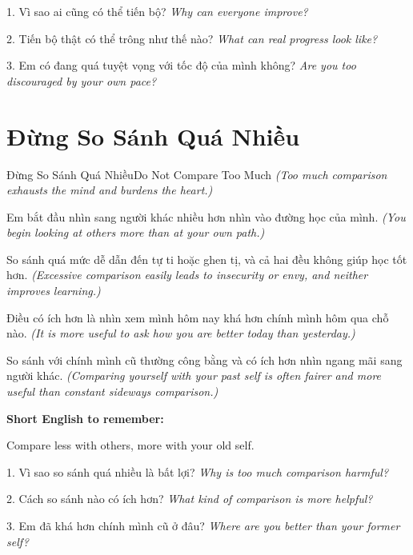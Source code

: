 \begin{tuhocnhanh}
1. Vì sao ai cũng có thể tiến bộ? \textit{Why can everyone improve?}

2. Tiến bộ thật có thể trông như thế nào? \textit{What can real progress look like?}

3. Em có đang quá tuyệt vọng với tốc độ của mình không? \textit{Are you too discouraged by your own pace?}
\end{tuhocnhanh}
\ngancach

\section{Đừng So Sánh Quá Nhiều}
\begin{truyen}{Đừng So Sánh Quá Nhiều}{Do Not Compare Too Much}
\textit{(Too much comparison exhausts the mind and burdens the heart.)}

Em bắt đầu nhìn sang người khác nhiều hơn nhìn vào đường học của mình.
\textit{(You begin looking at others more than at your own path.)}

So sánh quá mức dễ dẫn đến tự ti hoặc ghen tị, và cả hai đều không giúp học tốt hơn.
\textit{(Excessive comparison easily leads to insecurity or envy, and neither improves learning.)}

Điều có ích hơn là nhìn xem mình hôm nay khá hơn chính mình hôm qua chỗ nào.
\textit{(It is more useful to ask how you are better today than yesterday.)}
\end{truyen}

\begin{baihoc}
So sánh với chính mình cũ thường công bằng và có ích hơn nhìn ngang mãi sang người khác.
\textit{(Comparing yourself with your past self is often fairer and more useful than constant sideways comparison.)}
\end{baihoc}

\begin{ghinhoanh}
\textbf{Short English to remember:}

Compare less with others, more with your old self.

\end{ghinhoanh}

\begin{tuhocnhanh}
1. Vì sao so sánh quá nhiều là bất lợi? \textit{Why is too much comparison harmful?}

2. Cách so sánh nào có ích hơn? \textit{What kind of comparison is more helpful?}

3. Em đã khá hơn chính mình cũ ở đâu? \textit{Where are you better than your former self?}
\end{tuhocnhanh}
\ngancach

